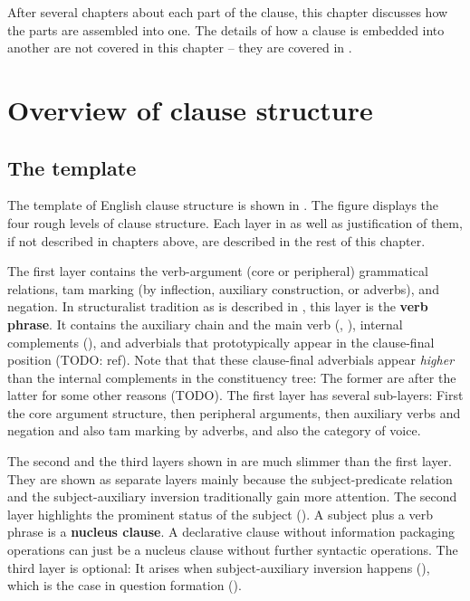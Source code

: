 \documentclass[UTF8, a4paper, oneside, scheme=plain]{ctexrep}
\newcommand*{\concept}[1]{\textbf{#1}}
\begin{document}
After several chapters about each part of the clause,
this chapter discusses how the parts are assembled into one.
The details of how a clause is embedded into another are not covered in this chapter
-- they are covered in .

\section{Overview of clause structure}\label{sec:clause-template}

\subsection{The template}

The template of English clause structure is shown in .
The figure displays the four rough levels of clause structure.
Each layer in  as well as justification of them,
if not described in chapters above, are described 
in the rest of this chapter.

The first layer contains the verb-argument (core or peripheral) grammatical relations,
\ac{tam} marking (by inflection, auxiliary construction, or adverbs), and negation.
In structuralist tradition as is described in \citet{cgel},
this layer is the \concept{verb phrase}.
It contains the auxiliary chain and the main verb 
(, ),
internal complements (),
and adverbials that prototypically appear in the clause-final position (TODO: ref).
Note that that these clause-final adverbials 
appear \emph{higher} than the internal complements 
in the constituency tree:
The former are after the latter for some other reasons (TODO).
The first layer has several sub-layers:
First the core argument structure,
then peripheral arguments, 
then auxiliary verbs and negation and also \acs{tam} marking by adverbs,
and also the category of voice. 

The second and the third layers shown in 
are much slimmer than the first layer.
They are shown as separate layers mainly because 
the subject-predicate relation 
and the subject-auxiliary inversion 
traditionally gain more attention.
The second layer highlights the prominent status of the subject ().
A subject plus a verb phrase is a \concept{nucleus clause}.
A declarative clause without information packaging operations
can just be a nucleus clause without further syntactic operations.
The third layer is optional:
It arises when subject-auxiliary inversion happens (),
which is the case in %
question formation ().
\end{document}

